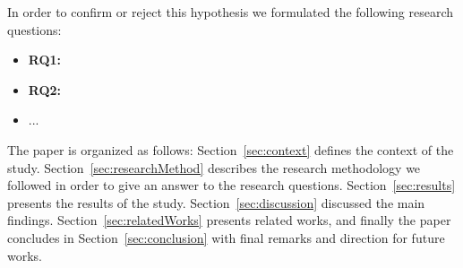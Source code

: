 In order to confirm or reject this hypothesis we formulated the following research questions:

\begin{itemize}
\item {\bf RQ1:}
\item {\bf RQ2:}
\item ...
\end{itemize}

The paper is organized as follows: Section~\ref{sec:context} defines the context of the study. Section~\ref{sec:researchMethod} describes the research methodology we followed in order to give an answer to the research questions. Section~\ref{sec:results} presents the results of the study. Section~\ref{sec:discussion} discussed the main findings. Section~\ref{sec:relatedWorks} presents related works, and finally the paper concludes in Section~\ref{sec:conclusion} with final remarks and direction for future works.
